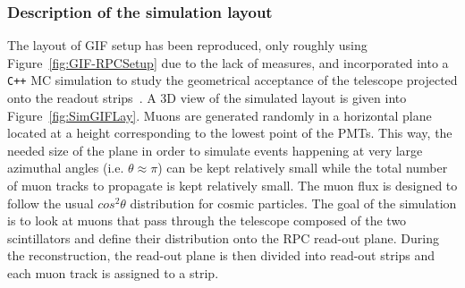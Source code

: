 		\subsubsection{Description of the simulation layout}
		\label{chapt5:sssec:SimLayout}
		
	The layout of GIF setup has been reproduced, only roughly using Figure~\ref{fig:GIF-RPCSetup} due to the lack of measures, and incorporated into a \texttt{C++} \acf{MC} simulation to study the geometrical acceptance of the telescope projected onto the readout strips~\cite{GEOACCEPT}. A 3D view of the simulated layout is given into Figure~\ref{fig:SimGIFLay}. Muons are generated randomly in a horizontal plane located at a height corresponding to the lowest point of the PMTs. This way, the needed size of the plane in order to simulate events happening at very large azimuthal angles (i.e. $\theta\approx\pi$) can be kept relatively small while the total number of muon tracks to propagate is kept relatively small. The muon flux is designed to follow the usual $cos^2\theta$ distribution for cosmic particles. The goal of the simulation is to look at muons that pass through the telescope composed of the two scintillators and define their distribution onto the RPC read-out plane. During the reconstruction, the read-out plane is then divided into read-out strips and each muon track is assigned to a strip.

